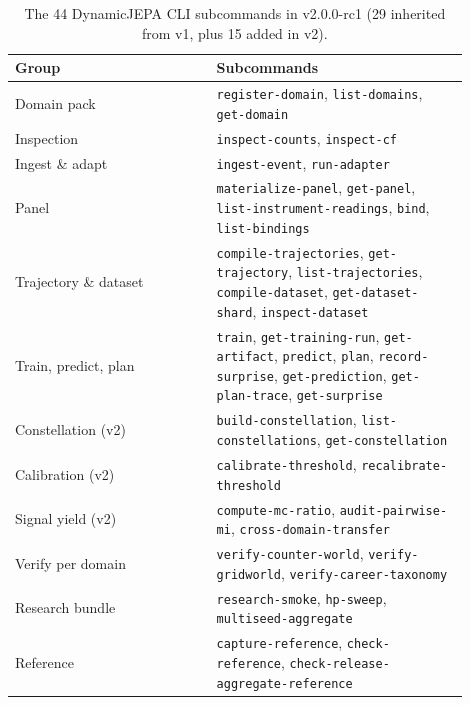 \documentclass[10pt,twocolumn,letterpaper]{article}
\newcommand{\code}[1]{\texttt{\small #1}}
\begin{document}
\begin{table}[t]
\caption{The 44 DynamicJEPA CLI subcommands in v2.0.0-rc1
  (29 inherited from v1, plus 15 added in v2).}
\label{tab:cli}
\centering\footnotesize
\begin{tabular}{p{0.4\linewidth}p{0.5\linewidth}}
\toprule
Group & Subcommands \\
\midrule
Domain pack & \code{register-domain}, \code{list-domains},
                \code{get-domain} \\
Inspection & \code{inspect-counts}, \code{inspect-cf} \\
Ingest \& adapt & \code{ingest-event}, \code{run-adapter} \\
Panel & \code{materialize-panel}, \code{get-panel},
                \code{list-instrument-readings},
                \code{bind}, \code{list-bindings} \\
Trajectory \& dataset & \code{compile-trajectories},
                \code{get-trajectory}, \code{list-trajectories},
                \code{compile-dataset}, \code{get-dataset-shard},
                \code{inspect-dataset} \\
Train, predict, plan & \code{train}, \code{get-training-run},
                \code{get-artifact}, \code{predict}, \code{plan},
                \code{record-surprise}, \code{get-prediction},
                \code{get-plan-trace}, \code{get-surprise} \\
Constellation (v2) & \code{build-constellation},
                \code{list-constellations},
                \code{get-constellation} \\
Calibration (v2) & \code{calibrate-threshold},
                \code{recalibrate-threshold} \\
Signal yield (v2) & \code{compute-mc-ratio},
                \code{audit-pairwise-mi},
                \code{cross-domain-transfer} \\
Verify per domain & \code{verify-counter-world},
                \code{verify-gridworld},
                \code{verify-career-taxonomy} \\
Research bundle & \code{research-smoke}, \code{hp-sweep},
                \code{multiseed-aggregate} \\
Reference & \code{capture-reference},
                \code{check-reference},
                \code{check-release-}\linebreak[1]\code{aggregate-reference} \\
\bottomrule
\end{tabular}
\end{table}
\end{document}
